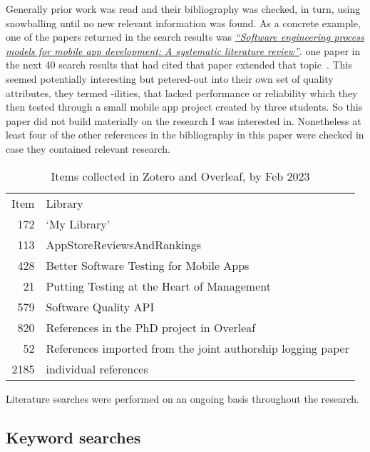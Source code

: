 Generally prior work was read and their bibliography was checked, in turn, using snowballing until no new relevant information was found. As a concrete example, one of the papers returned in the search results was \href{https://scholar.google.com/scholar?cites=17913946012612049501&as_sdt=2005&sciodt=0,5&hl=en}{\emph{``Software engineering process models for mobile app development: A systematic literature review''}}. one paper in the next 40 search results that had cited that paper extended that topic~. This seemed potentially interesting but petered-out into their own set of quality attributes, they termed -ilities, that lacked performance or reliability which they then tested through a small mobile app project created by three students. So this paper did not build materially on the research I was interested in. Nonetheless at least four of the other references in the bibliography in this paper were checked in case they contained relevant research. 

\begin{table}
    \centering
    \begin{tabular}{r|l}
       Item  &  Library \\
     172 & `My Library' \\
     113 & AppStoreReviewsAndRankings \\
     428 & Better Software Testing for Mobile Apps \\
      21 & Putting Testing at the Heart of Management \\
     579 & Software Quality API \\
     820 & References in the PhD project in Overleaf \\
      52 & References imported from the joint authorship logging paper \\
      \hline
      2185 & individual references \\
    \end{tabular}
    \caption{Items collected in Zotero and Overleaf, by  Feb 2023}
    \label{tab:zotero-libraries-counts}
\end{table}


Literature searches were performed on an ongoing basis throughout the research.

\subsection{Keyword searches}


